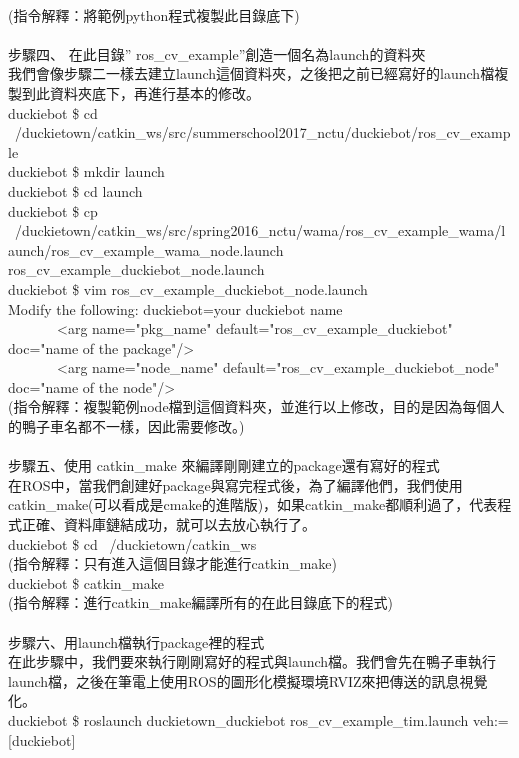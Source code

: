 \documentclass{article}
\begin{document}
\\(指令解釋：將範例python程式複製此目錄底下)
\\\\步驟四、 在此目錄” ros\_cv\_example”創造一個名為launch的資料夾
\\我們會像步驟二一樣去建立launch這個資料夾，之後把之前已經寫好的launch檔複製到此資料夾底下，再進行基本的修改。
\\duckiebot \$ cd ~/duckietown/catkin\_ws/src/summerschool2017\_nctu/duckiebot/ros\_cv\_example
\\duckiebot \$ mkdir launch
\\duckiebot \$ cd launch
\\duckiebot \$ cp ~/duckietown/catkin\_ws/src/spring2016\_nctu/wama/ros\_cv\_example\_wama/launch/ros\_cv\_example\_wama\_node.launch ros\_cv\_example\_duckiebot\_node.launch
\\duckiebot \$ vim ros\_cv\_example\_duckiebot\_node.launch
\\Modify the following: duckiebot=your duckiebot name
\\       <arg name="pkg\_name" default="ros\_cv\_example\_duckiebot" doc="name of the package"/>
\\       <arg name="node\_name" default="ros\_cv\_example\_duckiebot\_node" doc="name of the node"/>
\\(指令解釋：複製範例node檔到這個資料夾，並進行以上修改，目的是因為每個人的鴨子車名都不一樣，因此需要修改。)
\\\\步驟五、使用 catkin\_make 來編譯剛剛建立的package還有寫好的程式
\\在ROS中，當我們創建好package與寫完程式後，為了編譯他們，我們使用catkin\_make(可以看成是cmake的進階版)，如果catkin\_make都順利過了，代表程式正確、資料庫鏈結成功，就可以去放心執行了。
\\duckiebot \$ cd ~/duckietown/catkin\_ws
\\(指令解釋：只有進入這個目錄才能進行catkin\_make)
\\duckiebot \$ catkin\_make
\\(指令解釋：進行catkin\_make編譯所有的在此目錄底下的程式)
\\\\步驟六、用launch檔執行package裡的程式
\\在此步驟中，我們要來執行剛剛寫好的程式與launch檔。我們會先在鴨子車執行launch檔，之後在筆電上使用ROS的圖形化模擬環境RVIZ來把傳送的訊息視覺化。
\\duckiebot \$ roslaunch duckietown\_duckiebot ros\_cv\_example\_tim.launch veh:=[duckiebot]
\end{document}
